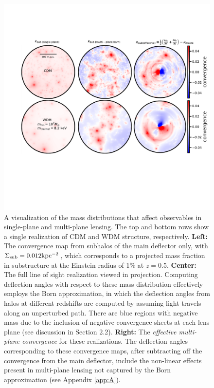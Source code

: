 \begin{figure}
	\centering
	\includegraphics[clip,trim=1cm 8.2cm 0.5cm
	5cm,width=.96\textwidth,keepaspectratio]{./figures_LOSforward/nonlinear_kappa_plot.pdf}
	\caption[Maps of the \textit{Effective multi-plane convergence} for CDM and WDM]{\label{fig:kappa_effective} A visualization of the mass distributions that affect observables in single-plane and multi-plane lensing. The top and bottom rows show a single realization of CDM and WDM structure, respectively. {\bf{Left:}} The convergence map from subhalos of the main deflector only, with $\Sigma_{\rm{sub}} = 0.012 \rm{kpc^{-2}}$, which corresponds to a projected mass fraction in substructure at the Einstein radius of $1\%$ at $z = 0.5$. {\bf{Center:}} The full line of sight realization viewed in projection. Computing deflection angles with respect to these mass distribution effectively employs the Born approximation, in which the deflection angles from halos at different redshifts are computed by assuming light travels along an unperturbed path. There are blue regions with negative mass due to the inclusion of negative convergence sheets at each lens plane (see discussion in Section 2.2). {\bf{Right:}} The \textit{effective multi-plane convergence} for these realizations. The deflection angles corresponding to these convergence maps, after subtracting off the convergence from the main deflector, include the non-linear effects present in multi-plane lensing not captured by the Born approximation (see Appendix \ref{app:A}).}
\end{figure}	
